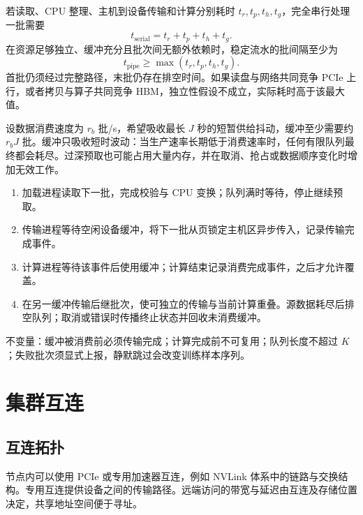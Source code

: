 \documentclass[../textbook.tex]{subfiles}
\begin{document}
若读取、CPU 整理、主机到设备传输和计算分别耗时 $t_r,t_p,t_h,t_g$，完全串行处理一批需要
\begin{equation}
 t_{\mathrm{serial}}=t_r+t_p+t_h+t_g.
\end{equation}
在资源足够独立、缓冲充分且批次间无额外依赖时，稳定流水的批间隔至少为
\begin{equation}
 t_{\mathrm{pipe}}\geq\max(t_r,t_p,t_h,t_g).
\end{equation}
首批仍须经过完整路径，末批仍存在排空时间。如果读盘与网络共同竞争 PCIe 上行，或者拷贝与算子共同竞争 HBM，独立性假设不成立，实际耗时高于该最大值。

设数据消费速度为 $r_b$ 批/s，希望吸收最长 $J$ 秒的短暂供给抖动，缓冲至少需要约 $r_bJ$ 批。缓冲只吸收短时波动：当生产速率长期低于消费速率时，任何有限队列最终都会耗尽。过深预取也可能占用大量内存，并在取消、抢占或数据顺序变化时增加无效工作。

\begin{algorithm}[有界预取与双缓冲]
\begin{enumerate}
\item 加载进程读取下一批，完成校验与 CPU 变换；队列满时等待，停止继续预取。
\item 传输进程等待空闲设备缓冲，将下一批从页锁定主机区异步传入，记录传输完成事件。
\item 计算进程等待该事件后使用缓冲；计算结束记录消费完成事件，之后才允许覆盖。
\item 在另一缓冲传输后继批次，使可独立的传输与当前计算重叠。源数据耗尽后排空队列；取消或错误时传播终止状态并回收未消费缓冲。
\end{enumerate}
不变量：缓冲被消费前必须传输完成；计算完成前不可复用；队列长度不超过 $K$；失败批次须显式上报，静默跳过会改变训练样本序列。
\end{algorithm}

\section{集群互连}

\subsection{互连拓扑}
节点内可以使用 PCIe 或专用加速器互连，例如 NVLink 体系中的链路与交换结构。专用互连提供设备之间的传输路径。远端访问的带宽与延迟由互连及存储位置决定，共享地址空间便于寻址。
\end{document}
